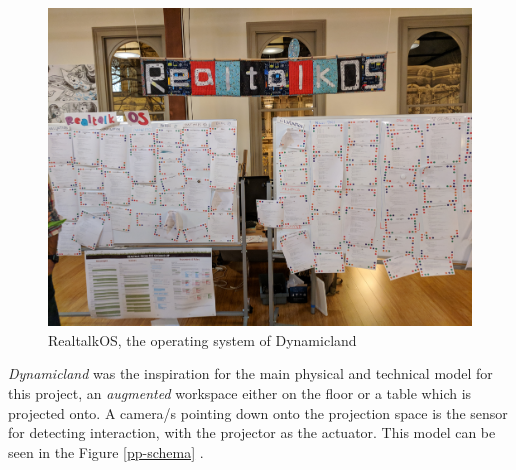 \documentclass[12pt]{report}
\begin{document}
\begin{figure}[htbp]
\centering
\includegraphics[width=15cm]{assets/realtalk-os.jpg}
\caption{RealtalkOS, the operating system of Dynamicland}
\end{figure} 

\emph{Dynamicland} was the inspiration for the main physical and technical model for
this project, an \emph{augmented} workspace either on the floor or a table which is
projected onto. A camera/s pointing down onto the projection space is the sensor
for detecting interaction, with the projector as the actuator. This model can be
seen in the Figure \ref{pp-schema}  .
\end{document}
